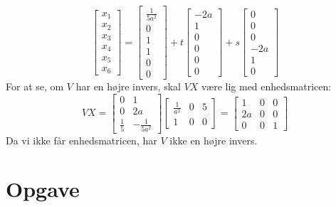 \documentclass[a4paper,12pt]{article}
\begin{document}
\[
\left[\begin{array}{c}
    x_1 \\
    x_2 \\
    x_3 \\
    x_4 \\
    x_5 \\
    x_6
\end{array}\right]
=
\left[\begin{array}{c}
    \frac{1}{5a^2} \\
    0 \\
    1 \\
    1 \\
    0 \\
    0
\end{array}\right]
+
t
\left[\begin{array}{c}
    -2a \\
    1 \\
    0 \\
    0 \\
    0 \\
    0
\end{array}\right]
+
s
\left[\begin{array}{c}
    0 \\
    0 \\
    0 \\
    -2a \\
    1 \\
    0
\end{array}\right]
\]
For at se, om $V$ har en højre invers, skal $VX$ være lig med enhedsmatricen:\\
\[
VX =
\left[\begin{array}{cc}
    0 & 1 \\
    0 & 2a \\
    \frac{1}{5} & -\frac{1}{5a^2}
\end{array}\right]
\left[\begin{array}{ccc}
    \frac{1}{a^2} & 0 & 5 \\
    1 & 0 & 0
\end{array}\right]
=
\left[\begin{array}{ccc}
    1 & 0 & 0 \\
    2a & 0 & 0 \\
    0 & 0 & 1
\end{array}\right]
\]
Da vi ikke får enhedsmatricen, har $V$ ikke en højre invers.\\

\section[Opgave]{Opgave}
\end{document}
